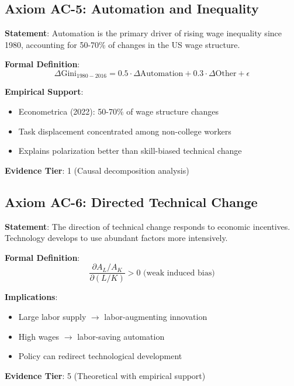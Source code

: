\subsection{Axiom AC-5: Automation and Inequality}

\begin{tcolorbox}[colback=red!5!white,colframe=red!75!black,title=Axiom AC-5: Automation Drives Inequality]
\textbf{Statement}: Automation is the primary driver of rising wage inequality since 1980, accounting for 50-70\% of changes in the US wage structure.

\textbf{Formal Definition}:
\begin{equation}
\Delta \text{Gini}_{1980-2016} = 0.5 \cdot \Delta \text{Automation} + 0.3 \cdot \Delta \text{Other} + \epsilon
\end{equation}

\textbf{Empirical Support}:
\begin{itemize}
    \item Econometrica (2022): 50-70\% of wage structure changes
    \item Task displacement concentrated among non-college workers
    \item Explains polarization better than skill-biased technical change
\end{itemize}

\textbf{Evidence Tier}: 1 (Causal decomposition analysis)
\end{tcolorbox}

\subsection{Axiom AC-6: Directed Technical Change}

\begin{tcolorbox}[colback=green!5!white,colframe=green!75!black,title=Axiom AC-6: Endogenous Direction of Technology]
\textbf{Statement}: The direction of technical change responds to economic incentives. Technology develops to use abundant factors more intensively.

\textbf{Formal Definition}:
\begin{equation}
\frac{\partial A_L/A_K}{\partial (L/K)} > 0 \text{ (weak induced bias)}
\end{equation}

\textbf{Implications}:
\begin{itemize}
    \item Large labor supply $\rightarrow$ labor-augmenting innovation
    \item High wages $\rightarrow$ labor-saving automation
    \item Policy can redirect technological development
\end{itemize}

\textbf{Evidence Tier}: 5 (Theoretical with empirical support)
\end{tcolorbox}


